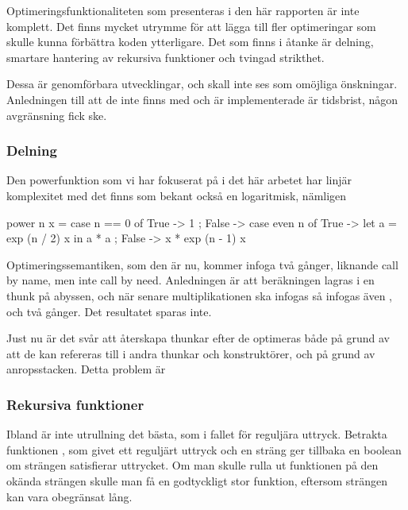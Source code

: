 \documentclass[Rapport]{subfiles}
\begin{document}
Optimeringsfunktionaliteten som presenteras i den här rapporten är inte
komplett. Det finns mycket utrymme för att lägga till fler optimeringar
som skulle kunna förbättra koden ytterligare. Det som finns i åtanke är
delning, smartare hantering av rekursiva funktioner och tvingad strikthet.

Dessa är genomförbara utvecklingar, och skall inte ses som omöjliga önskningar.
Anledningen till att de inte finns med och är implementerade är tidsbrist,
någon avgränsning fick ske.

\subsubsection{Delning}
Den powerfunktion som vi har fokuserat på i det här arbetet har linjär
komplexitet med det finns som bekant också en logaritmisk, nämligen

\begin{codeEx}
power n x = case n == 0 of
    { True  -> 1
    ; False -> case even n of
        { True  -> let a = exp (n / 2) x 
                   in  a * a
        ; False -> x * exp (n - 1) x
        }
    }
\end{codeEx}

Optimeringssemantiken, som den är nu, kommer infoga  två gånger,
liknande call by name, men inte call by need. Anledningen är att beräkningen
 lagras i en thunk på abyssen, och när senare multiplikationen ska
infogas så infogas även , och två gånger. Det resultatet sparas
inte.

    Just nu är det svår att återskapa thunkar efter de optimeras både på grund
av att de kan refereras till i andra thunkar och konstruktörer, och på grund
av anropsstacken. Detta problem är 

\subsubsection{Rekursiva funktioner}


Ibland är inte utrullning det bästa, som i fallet för reguljära uttryck.
Betrakta funktionen , som givet
ett reguljärt uttryck och en sträng ger tillbaka en boolean om strängen
satisfierar uttrycket. Om man skulle rulla ut funktionen på den okända strängen
skulle man få en godtyckligt stor funktion, eftersom strängen kan vara 
obegränsat lång.
\end{document}
